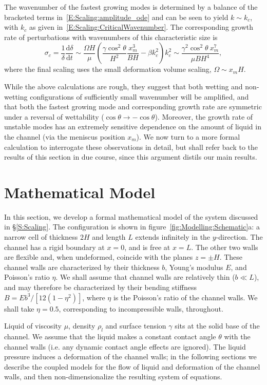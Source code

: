 \documentclass{jfm}
\newcommand{\dd}[2]{\frac{\mathrm{d} #1}{\mathrm{d} #2}}
\newcommand{\poisson}{\eta} %
\begin{document}
The wavenumber of the fastest growing modes is determined by a balance of the bracketed terms in~\eqref{E:Scaling:amplitude_ode} and can be seen to yield $k \sim k_c$, with $k_c$ as given in~\eqref{E:Scaling:CriticalWavenumber}. The corresponding growth rate of perturbations with wavenumbers of this characteristic size is
\begin{equation}\label{E:Scaling:SigmaScaling1}
\sigma_c =  \frac{1}{\delta} \dd{\delta}{t} \sim \frac{\Omega H}{\mu}\left(\frac{\gamma \cos^2 \theta}{H^2}\frac{x_m^3}{B H} - \beta k_c^2\right)k_c^2 \sim \frac{\gamma^2 \cos^2 \theta ~ x_m^7}{\mu B H^{4}},
\end{equation}
where the final scaling uses the small deformation volume scaling, $\Omega \sim x_m H$. 

While the above calculations are rough, they suggest that both wetting and non-wetting configurations of sufficiently small wavenumber will be amplified, and that both the fastest growing mode and corresponding growth rate are symmetric under a reversal of wettability ($\cos \theta \to -\cos \theta$). Moreover, the growth rate of unstable modes has an extremely sensitive dependence on the amount of liquid in the channel (via the meniscus position $x_m$). We now turn to a more formal calculation to interrogate these observations in detail, but shall refer back to the results of this section in due course, since this argument distils our main results.

\section{Mathematical Model}
In this section, we develop a formal mathematical model of the system discussed in \S\ref{S:Scaling}. The configuration is shown in figure~\ref{fig:Modelling:Schematic}a: a narrow cell of thickness $2H$ and length $L$ extends infinitely in the $y$-direction. The channel has a rigid boundary at $x = 0$, and is free at $x = L$. The other two walls are flexible and, when undeformed, coincide with the planes $z = \pm H$. These channel walls are characterized by their thickness $b$, Young's modulus $E$, and Poisson's ratio $\poisson$. We shall assume that channel walls are relatively thin ($b \ll L$), and may therefore be characterized by their bending stiffness $B = Eb^3 / [12(1-\poisson^2)]$, where $\poisson$ is the Poisson's ratio of the channel walls. We shall take $\eta = 0.5$, corresponding to incompressible walls, throughout.

Liquid of viscosity $\mu$, density $\rho_l$ and surface tension $\gamma$ sits at the solid base of the channel. We assume that the liquid makes a constant contact angle $\theta$ with the channel walls (i.e. any dynamic contact angle effects are ignored). The liquid pressure induces a deformation of the channel walls; in the following sections we describe the coupled models for the flow of liquid and deformation of the channel walls, and then non-dimensionalize the resulting system of equations.
\end{document}
